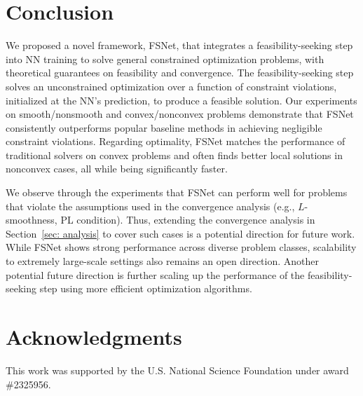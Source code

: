 \documentclass{article}
\begin{document}
\section{Conclusion}\label{sec: conclusion}
We proposed a novel framework, FSNet, that integrates a feasibility-seeking step into NN training to solve general constrained optimization problems, with theoretical guarantees on feasibility and convergence.
The feasibility-seeking step solves an unconstrained optimization over a function of constraint violations, initialized at the NN's prediction, to produce a feasible solution. 
Our experiments on smooth/nonsmooth and convex/nonconvex problems demonstrate that FSNet consistently outperforms popular baseline methods in achieving negligible constraint violations. 
Regarding optimality, FSNet matches the performance of traditional solvers on convex problems and often finds better local solutions in nonconvex cases, all while being significantly faster.

We observe through the experiments that FSNet can perform well for problems that violate the assumptions used in the convergence analysis (e.g., $L$-smoothness, PL condition). Thus, extending the convergence analysis in Section~\ref{sec: analysis} to cover such cases is a potential direction for future work.
While FSNet shows strong performance across diverse problem classes, scalability to extremely large-scale settings also remains an open direction. 
Another potential future direction is further scaling up the performance of the feasibility-seeking step using more efficient optimization algorithms.

\clearpage
\section*{Acknowledgments}
This work was supported by the U.S. National Science Foundation under award \#2325956.

\medskip
{
\small


}

\newpage
\appendix
{}
\end{document}
